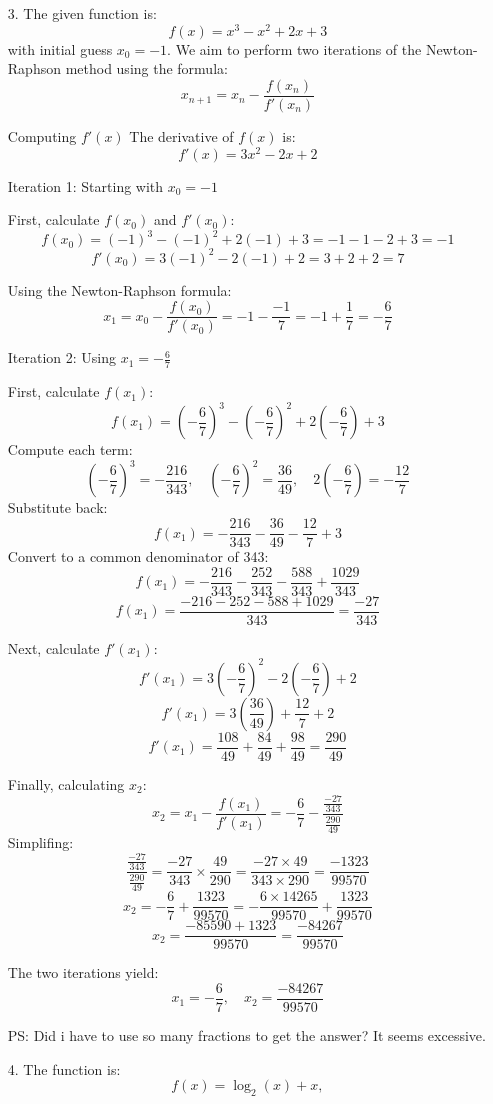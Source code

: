 \documentclass[12pt]{article}
\begin{document}
\begin{enumerate}
\item [3. ]
The given function is:
\[
f(x) = x^3 - x^2 + 2x + 3
\]
with initial guess \( x_0 = -1 \). We aim to perform two iterations of the Newton-Raphson method using the formula:
\[
x_{n+1} = x_n - \frac{f(x_n)}{f'(x_n)}
\]

Computing \( f'(x) \)
The derivative of \( f(x) \) is:
\[
f'(x) = 3x^2 - 2x + 2
\]

Iteration 1: Starting with \( x_0 = -1 \)

First, calculate \( f(x_0) \) and \( f'(x_0) \):
\[
f(x_0) = (-1)^3 - (-1)^2 + 2(-1) + 3 = -1 - 1 - 2 + 3 = -1
\]
\[
f'(x_0) = 3(-1)^2 - 2(-1) + 2 = 3 + 2 + 2 = 7
\]

Using the Newton-Raphson formula:
\[
x_1 = x_0 - \frac{f(x_0)}{f'(x_0)} = -1 - \frac{-1}{7} = -1 + \frac{1}{7} = -\frac{6}{7}
\]

Iteration 2: Using \( x_1 = -\frac{6}{7} \)

First, calculate \( f(x_1) \):
\[
f(x_1) = \left(-\frac{6}{7}\right)^3 - \left(-\frac{6}{7}\right)^2 + 2\left(-\frac{6}{7}\right) + 3
\]
Compute each term:
\[
\left(-\frac{6}{7}\right)^3 = -\frac{216}{343}, \quad \left(-\frac{6}{7}\right)^2 = \frac{36}{49}, \quad 2\left(-\frac{6}{7}\right) = -\frac{12}{7}
\]
Substitute back:
\[
f(x_1) = -\frac{216}{343} - \frac{36}{49} - \frac{12}{7} + 3
\]
Convert to a common denominator of 343:
\[
f(x_1) = -\frac{216}{343} - \frac{252}{343} - \frac{588}{343} + \frac{1029}{343}
\]
\[
f(x_1) = \frac{-216 - 252 - 588 + 1029}{343} = \frac{-27}{343}
\]

Next, calculate \( f'(x_1) \):
\[
f'(x_1) = 3\left(-\frac{6}{7}\right)^2 - 2\left(-\frac{6}{7}\right) + 2
\]
\[
f'(x_1) = 3\left(\frac{36}{49}\right) + \frac{12}{7} + 2
\]
\[
f'(x_1) = \frac{108}{49} + \frac{84}{49} + \frac{98}{49} = \frac{290}{49}
\]

Finally, calculating \( x_2 \):
\[
x_2 = x_1 - \frac{f(x_1)}{f'(x_1)} = -\frac{6}{7} - \frac{\frac{-27}{343}}{\frac{290}{49}}
\]
Simplifing:
\[
\frac{\frac{-27}{343}}{\frac{290}{49}} = \frac{-27}{343} \times \frac{49}{290} = \frac{-27 \times 49}{343 \times 290} = \frac{-1323}{99570}
\]
\[
x_2 = -\frac{6}{7} + \frac{1323}{99570} = -\frac{6 \times 14265}{99570} + \frac{1323}{99570}
\]
\[
x_2 = \frac{-85590 + 1323}{99570} = \frac{-84267}{99570}
\]

The two iterations yield:
\[
x_1 = -\frac{6}{7}, \quad x_2 = \frac{-84267}{99570}
\]

PS: Did i have to use so many fractions to get the answer? It seems excessive.
\item [4.]
The function is:
\[
f(x) = \log_2(x) + x,
\]



\end{enumerate}
\end{document}
